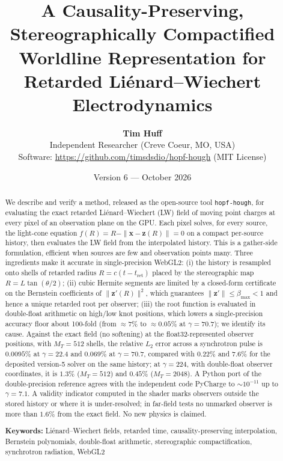 \documentclass[11pt, a4paper]{article}
\title{\textbf{A Causality-Preserving, Stereographically Compactified Worldline Representation for Retarded Li\'enard--Wiechert Electrodynamics}}
\author{\textbf{Tim Huff} \\ \small Independent Researcher (Creve Coeur, MO, USA) \\ \small Software: \url{https://github.com/timsdsdio/hopf-hough} (MIT License)}
\date{Version 6 --- October 2026}
\begin{document}
\maketitle

\begin{abstract}
\noindent We describe and verify a method, released as the open-source tool \texttt{hopf-hough}, for evaluating the exact retarded Li\'enard--Wiechert (LW) field of moving point charges at every pixel of an observation plane on the GPU. Each pixel solves, for every source, the light-cone equation $f(R) = R - \|\mathbf{x} - \mathbf{z}(R)\| = 0$ on a compact per-source history, then evaluates the LW field from the interpolated history. This is a gather-side formulation, efficient when sources are few and observation points many. Three ingredients make it accurate in single-precision WebGL2: (i) the history is resampled onto shells of retarded radius $R = c(t - t_{\text{ret}})$ placed by the stereographic map $R = L\tan(\theta/2)$; (ii) cubic Hermite segments are limited by a closed-form certificate on the Bernstein coefficients of $\|\mathbf{z}'(R)\|^2$, which guarantees $\|\mathbf{z}'\| \le \beta_{\max} < 1$ and hence a unique retarded root per observer; (iii) the root function is evaluated in double-float arithmetic on high/low knot positions, which lowers a single-precision accuracy floor about 100-fold (from $\approx 7\%$ to $\approx 0.05\%$ at $\gamma = 70.7$); we identify its cause. Against the exact field (no softening) at the float32-represented observer positions, with $M_T = 512$ shells, the relative $L_2$ error across a synchrotron pulse is $0.0095\%$ at $\gamma = 22.4$ and $0.069\%$ at $\gamma = 70.7$, compared with $0.22\%$ and $7.6\%$ for the deposited version-5 solver on the same history; at $\gamma = 224$, with double-float observer coordinates, it is $1.3\%$ ($M_T = 512$) and $0.45\%$ ($M_T = 2048$). A Python port of the double-precision reference agrees with the independent code PyCharge to $\sim\!10^{-11}$ up to $\gamma = 7.1$. A validity indicator computed in the shader marks observers outside the stored history or where it is under-resolved; in far-field tests no unmarked observer is more than $1.6\%$ from the exact field. No new physics is claimed.

\vspace{0.15cm}
\noindent \textbf{Keywords:} Li\'enard--Wiechert fields, retarded time, causality-preserving interpolation, Bernstein polynomials, double-float arithmetic, stereographic compactification, synchrotron radiation, WebGL2
\end{abstract}
\end{document}
